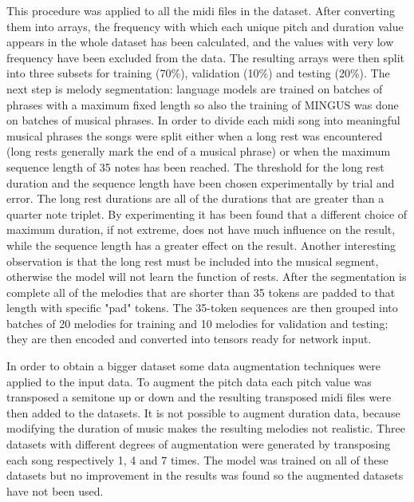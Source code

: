 \documentclass{article}
\begin{document}
This procedure was applied to all the midi files in the dataset. After converting them into arrays, the frequency with which each unique pitch and duration value appears in the whole dataset has been calculated, and the values with very low frequency have been excluded from the data. 
The resulting arrays were then split into three subsets for training (70\%), validation (10\%) and testing (20\%). The next step is melody segmentation: language models are trained on batches of phrases with a maximum fixed length so also the training of MINGUS was done on batches of musical phrases. In order to divide each midi song into meaningful musical phrases the songs were split either when a long rest was encountered (long rests generally mark the end of a musical phrase) or when the maximum sequence length of 35 notes has been reached. The threshold for the long rest duration and the sequence length have been chosen experimentally by trial and error. The long rest durations are all of the durations that are greater than a quarter note triplet. By experimenting it has been found that a different choice of maximum duration, if not extreme, does not have much influence on the result, while the sequence length has a greater effect on the result. Another interesting observation is that the long rest must be included into the musical segment, otherwise the model will not learn the function of rests.
After the segmentation is complete all of the melodies that are shorter than 35 tokens are padded to that length with specific "pad" tokens. The 35-token sequences are then grouped into batches of 20 melodies for training and 10 melodies for validation and testing; they are then encoded and converted into tensors ready for network input. 

In order to obtain a bigger dataset some data augmentation techniques were applied to the input data. To augment the pitch data each pitch value was transposed a semitone up or down and the resulting transposed midi files were then added to the datasets. It is not possible to augment duration data, because modifying the duration of music makes the resulting melodies not realistic. 
Three datasets with different degrees of augmentation were generated by transposing each song respectively 1, 4 and 7 times. The model was trained on all of these datasets but no improvement in the results was found so the augmented datasets have not been used.
\end{document}
